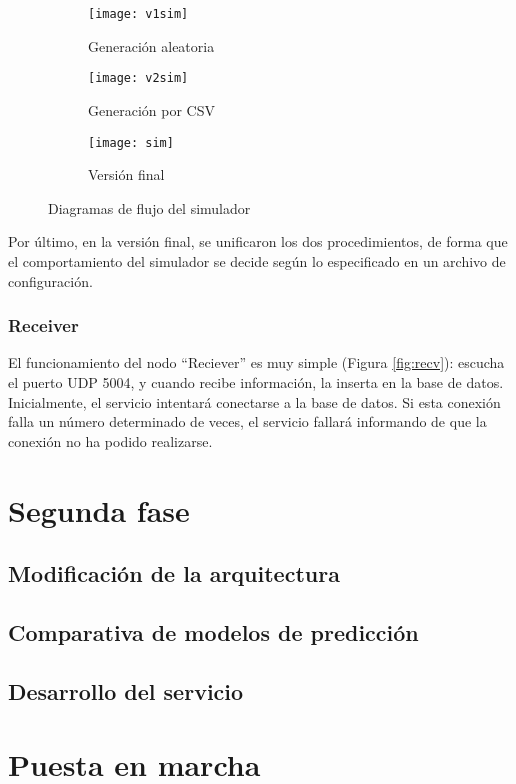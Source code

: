 \begin{figure}
    \centering
    \begin{subfigure}[b]{0.45\textwidth}
        \centering
        \texttt{[image: v1sim]}
        \caption{Generación aleatoria}
        \label{fig:v1sim}
    \end{subfigure}
    \hfill
    \begin{subfigure}[b]{0.45\textwidth}
        \centering
        \texttt{[image: v2sim]}
        \caption{Generación por CSV}
        \label{fig:v2sim}
    \end{subfigure}
    \begin{subfigure}[b]{0.7\textwidth}
        \centering
        \texttt{[image: sim]}
        \caption{Versión final}
        \label{fig:sim}
    \end{subfigure}
    \caption{Diagramas de flujo del simulador}
    \label{fig:diagsim}
\end{figure}

Por último, en la versión final, se unificaron los dos procedimientos, de forma que el comportamiento del simulador
se decide según lo especificado en un archivo de configuración.

\subsubsection*{Receiver}

El funcionamiento del nodo ``Reciever'' es muy simple (Figura \ref*{fig:recv}): escucha el puerto UDP 5004, y cuando recibe información, la inserta 
en la base de datos. Inicialmente, el servicio intentará conectarse a la base de datos. Si esta conexión falla un número
determinado de veces, el servicio fallará informando de que la conexión no ha podido realizarse.


\section{Segunda fase}
\subsection*{Modificación de la arquitectura}
\subsection*{Comparativa de modelos de predicción}
\subsection*{Desarrollo del servicio}

\section*{Puesta en marcha}